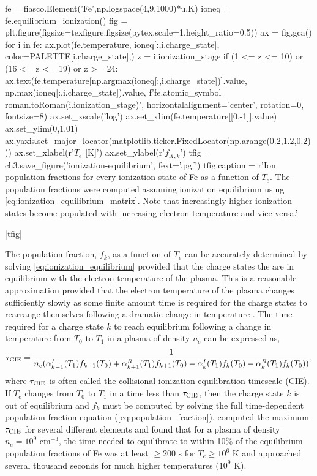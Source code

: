 \begin{pycode}[chapter3]
fe = fiasco.Element('Fe',np.logspace(4,9,1000)*u.K)
ioneq = fe.equilibrium_ionization()
fig = plt.figure(figsize=texfigure.figsize(pytex,scale=1,height_ratio=0.5))
ax = fig.gca()
for i in fe:
    ax.plot(fe.temperature, ioneq[:,i.charge_state],
            color=PALETTE[i.charge_state],)
    z = i.ionization_stage
    if (1 <= z <= 10) or (16 <= z <= 19) or z >= 24:
        ax.text(fe.temperature[np.argmax(ioneq[:,i.charge_state])].value,
                np.max(ioneq[:,i.charge_state]).value,
                f'{fe.atomic_symbol} {roman.toRoman(i.ionization_stage)}',
                horizontalalignment='center', rotation=0,
                fontsize=8)
ax.set_xscale('log')
ax.set_xlim(fe.temperature[[0,-1]].value)
ax.set_ylim(0,1.01)
ax.yaxis.set_major_locator(matplotlib.ticker.FixedLocator(np.arange(0.2,1.2,0.2)))
ax.set_xlabel(r'$T_e$ [K]')
ax.set_ylabel(r'$f_{X,k}$')
tfig = ch3.save_figure('ionization-equilibrium', fext='.pgf')
tfig.caption = r'Ion population fractions for every ionization state of Fe as a function of $T_e$. The population fractions were computed assuming ionization equilibrium using \autoref{eq:ionization_equilibrium_matrix}. Note that increasingly higher ionization states become populated with increasing electron temperature and vice versa.'
\end{pycode}
\py[chapter3]|tfig|

The population fraction, $f_k$, as a function of $T_e$ can be accurately determined by solving \autoref{eq:ionization_equilibrium} provided that the charge states the are in equilibrium with the electron temperature of the plasma. This is a reasonable approximation provided that the electron temperature of the plasma changes sufficiently slowly as some finite amount time is required for the charge states to rearrange themselves following a dramatic change in temperature \citep{bradshaw_collisional_2013}. The time required for a charge state $k$ to reach equilibrium following a change in temperature from $T_0$ to $T_1$ in a plasma of density $n_e$ can be expressed as,
\begin{equation}\label{eq:cie_timescale}
    \tau_\textup{CIE} = \frac{1}{n_e(\alpha_{k-1}^I(T_1) f_{k-1}(T_0) + \alpha_{k+1}^R(T_1) f_{k+1}(T_0) - \alpha_{k}^I(T_1) f_k(T_0) - \alpha_k^R(T_1) f_k(T_0))},
\end{equation}
where $\tau_\textup{CIE}$ is often called the collisional ionization equilibration timescale (CIE). If $T_e$ changes from $T_0$ to $T_1$ in a time less than $\tau_\textup{CIE}$, then the charge state $k$ is out of equilibrium and $f_k$ must be computed by solving the full time-dependent population fraction equation (\autoref{eq:population_fraction}). \citet{smith_ionization_2010} computed the maximum $\tau_\textup{CIE}$ for several different elements and found that for a plasma of density $n_e=10^9$ cm$^{-3}$, the time needed to equilibrate to within 10\% of the equilibrium population fractions of Fe was at least $\ge200$ s for $T_e\ge10^6$ K and approached several thousand seconds for much higher temperatures ($10^9$ K).

